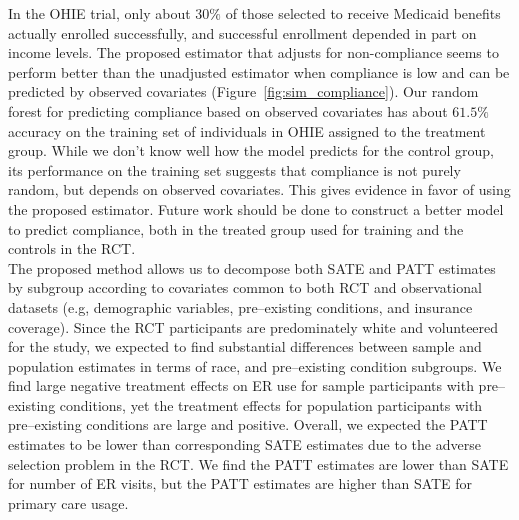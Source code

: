 \documentclass[12pt]{article}
\begin{document}
In the OHIE trial, only about $30\%$ of those selected to receive Medicaid benefits actually enrolled successfully, and successful enrollment depended in part on income levels.  The proposed estimator that adjusts for non-compliance seems to perform better than the unadjusted estimator when compliance is low and can be predicted by observed covariates (Figure~\ref{fig:sim_compliance}).  Our random forest for predicting compliance based on observed covariates has about $61.5\%$ accuracy on the training set of individuals in OHIE assigned to the treatment group.  While we don't know well how the model predicts for the control group, its performance on the training set suggests that compliance is not purely random, but depends on observed covariates.  This gives evidence in favor of using the proposed estimator.  Future work should be done to construct a better model to predict compliance, both in the treated group used for training and the controls in the RCT. \\

The proposed method allows us to decompose both SATE and PATT estimates by subgroup according to covariates common to both RCT and observational datasets (e.g, demographic variables, pre--existing conditions, and insurance coverage). Since the RCT participants are predominately white and volunteered for the study, we expected to find substantial differences between sample and population estimates in terms of race, and pre--existing condition subgroups. We find large negative treatment effects on ER use for sample participants with pre--existing conditions, yet the treatment effects for population participants with pre--existing conditions are large and positive. Overall, we expected the PATT estimates to be lower than corresponding SATE estimates due to the adverse selection problem in the RCT. We find the PATT estimates are lower than SATE for number of ER visits, but the PATT estimates are higher than SATE for primary care usage. \\





\begin{singlespace}		%





\end{singlespace}

\itemize
\end{document}
